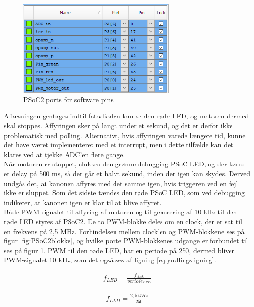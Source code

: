 \begin{figure}[H]
	\centering
	\includegraphics[width=0.7\textwidth]{Afsnit/DesignOgImplementering/images/PSoC2porte}
	\caption{PSoC2 ports for software pins} 
	\label{fig:PSoC2ports}
\end{figure}

\noindent Aflæsningen gentages indtil fotodioden kan se den røde LED, og motoren dermed skal stoppes. Affyringen sker på langt under et sekund, og det er derfor ikke problematisk med polling. Alternativt, hvis affyringen varede længere tid, kunne det have været implementeret med et interrupt, men i dette tilfælde kan det klares ved at tjekke ADC'en flere gange. \\
Når motoren er stoppet, slukkes den grønne debugging PSoC-LED, og der køres et delay på 500 ms, så der går et halvt sekund, inden der igen kan skydes. Derved undgås det, at kanonen affyres med det samme igen, hvis triggeren ved en fejl ikke er sluppet. Som det sidste tændes den røde PSoC LED, som ved debugging indikerer, at kanonen igen er klar til at blive affyret. \\
Både PWM-signalet til affyring af motoren og til generering af 10 kHz til den røde LED styres af PSoC2. De to PWM-blokke deles om en clock, der er sat til en frekvens på 2,5 MHz. Forbindelsen mellem clock'en og PWM-blokkene ses på figur \ref{fig:PSoC2blokke}, og hvilke porte PWM-blokkenes udgange er forbundet til ses på figur \ref{fig:PSoC2ports}. PWM til den røde LED, har en periode på 250, dermed bliver PWM-signalet 10 kHz, som det også ses af ligning \ref{eq:yndlingsligning}.

\begin{align}
f_{LED} = \frac{f_{clock}}{periode_{LED}} \label{eq:yndlingsligning}
\end{align}

\begin{align}
f_{LED} = \frac{2,5 MHz}{250}\nonumber
\end{align}


